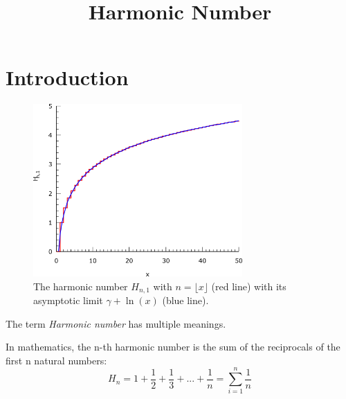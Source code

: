 \documentclass[2pt]{article}
\title{\textbf{Harmonic Number}}
\begin{document}
\date{\vspace{-5ex}}
\maketitle 
\section{Introduction}
\begin{figure}
\includegraphics[width=8cm]{1.png}\caption{\small{The harmonic number $H_{n,1}$ with $n=\lfloor{x}\rfloor$ (red line) with its asymptotic limit $\gamma+\ln(x)$ (blue line).}}\end{figure}
\begin{flushleft}
The term \emph{Harmonic number} has multiple meanings.
\end{flushleft}
In mathematics, the n-th harmonic number is the sum of the reciprocals of the first n natural numbers:
\begin{equation}
H_{n}=1+\frac{1}{2}+\frac{1}{3}+...+\frac{1}{n}=\sum_{i=1}^n \frac{1}{n} \label{nth harmonic number}\nonumber
\end{equation}
\end{document}
